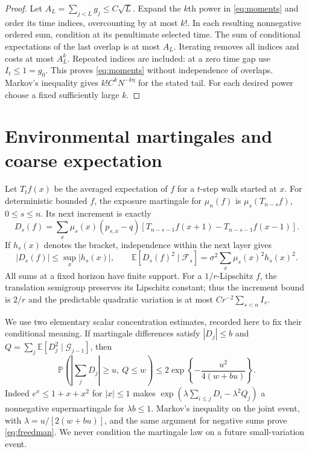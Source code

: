 \documentclass[11pt]{article}
\newcommand{\EE}{\mathbb E}
\newcommand{\PP}{\mathbb P}
\newcommand{\cF}{\mathcal F}
\begin{document}
\begin{proof}
Let $A_L=\sum_{j<L}g_j\leq C\sqrt L$.
Expand the $k$th power in \eqref{eq:moments} and order its time
indices, overcounting by at most $k!$. In each resulting nonnegative
ordered sum, condition at its penultimate selected time.
The sum of conditional expectations of the last overlap is at most
$A_L$. Iterating removes all indices and costs at most $A_L^k$.
Repeated indices are included: at a zero time gap use $I_t\leq1=g_0$.
This proves \eqref{eq:moments} without independence of overlaps.
Markov's inequality gives $k!C^kN^{-k\eta}$ for the stated tail.
For each desired power choose a fixed sufficiently large $k$.
\end{proof}

\section{Environmental martingales and coarse expectation}

Let $T_tf(x)$ be the averaged expectation of $f$ for a $t$-step
walk started at $x$. For deterministic bounded $f$, the exposure
martingale for $\mu_n(f)$ is $\mu_s(T_{n-s}f)$, $0\leq s\leq n$.
Its next increment is exactly
\begin{equation}\label{eq:increment}
 D_s(f)=\sum_x\mu_s(x)(p_{s,x}-q)
       [T_{n-s-1}f(x+1)-T_{n-s-1}f(x-1)].
\end{equation}
If $h_s(x)$ denotes the bracket, independence within the next layer gives
\begin{equation}\label{eq:variation}
 |D_s(f)|\leq\sup_x|h_s(x)|,\qquad
 \EE[D_s(f)^2\mid\cF_s]
             =\sigma^2\sum_x\mu_s(x)^2h_s(x)^2.
\end{equation}
All sums at a fixed horizon have finite support.
For a $1/r$-Lipschitz $f$, the translation semigroup preserves its
Lipschitz constant; thus the increment bound is $2/r$ and the
predictable quadratic variation is at most
$Cr^{-2}\sum_{s<n}I_s$.

We use two elementary scalar concentration estimates, recorded here
to fix their conditional meaning. If martingale differences satisfy
$|D_j|\leq b$ and $Q=\sum_j\EE[D_j^2\mid\mathcal G_{j-1}]$, then
\begin{equation}\label{eq:freedman}
 \PP\left(\left|\sum_jD_j\right|\geq u,\ Q\leq w\right)
       \leq2\exp\left\{-\frac{u^2}{4(w+bu)}\right\}.
\end{equation}
Indeed $e^x\leq1+x+x^2$ for $|x|\leq1$ makes
$\exp(\lambda\sum_{i\leq j}D_i-\lambda^2Q_j)$ a nonnegative
supermartingale for $\lambda b\leq1$.
Markov's inequality on the joint event, with
$\lambda=u/[2(w+bu)]$, and the same argument for negative sums prove
\eqref{eq:freedman}. We never condition the martingale law on a
future small-variation event.
\end{document}
